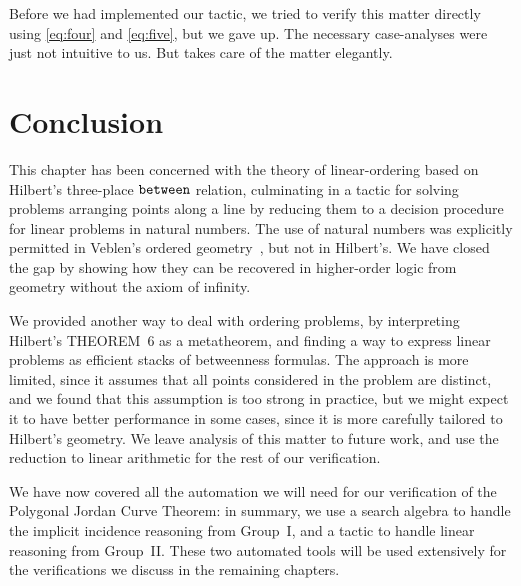 Before we had implemented our tactic, we tried to verify this matter directly using \ref{eq:four} and \ref{eq:five}, but we gave up. The necessary case-analyses were just not intuitive to us. But  takes care of the matter elegantly.

\linebreak

\section{Conclusion}
This chapter has been concerned with the theory of linear-ordering based on Hilbert's three-place $\texttt{between}$ relation, culminating in a tactic for solving problems arranging points along a line by reducing them to a decision procedure for linear problems in natural numbers. The use of natural numbers was explicitly permitted in Veblen's ordered geometry~\cite{Veblenphd}, but not in Hilbert's. We have closed the gap by showing how they can be recovered in higher-order logic from geometry without the axiom of infinity.

We provided another way to deal with ordering problems, by interpreting Hilbert's THEOREM~6 as a metatheorem, and finding a way to express linear problems as efficient stacks of betweenness formulas. The approach is more limited, since it assumes that all points considered in the problem are distinct, and we found that this assumption is too strong in practice, but we might expect it to have better performance in some cases, since it is more carefully tailored to Hilbert's geometry. We leave analysis of this matter to future work, and use the reduction to linear arithmetic for the rest of our verification.

We have now covered all the automation we will need for our verification of the Polygonal Jordan Curve Theorem: in summary, we use a search algebra to handle the implicit incidence reasoning from Group~I, and a tactic to handle linear reasoning from Group~II. These two automated tools will be used extensively for the verifications we discuss in the remaining chapters. 

